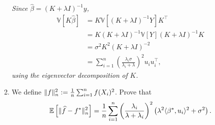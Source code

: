 \documentclass[a4paper,10pt,fleqn]{article}
\newcommand{\E}{\ensuremath{\mathbb{E}}}
\newcommand{\1}{\ensuremath{\mathbbm{1}}}
\begin{document}
\begin{enumerate}
\vspace{.2cm}

{\em
Since $\widehat{\beta} = (K + \lambda I)^{-1}y$, 
		\begin{align*}
			\mathbb{V}[K \widehat{\beta}] & = K \mathbb{V}[ (K + \lambda I)^{-1} Y ] K^\top\\
			& = K (K + \lambda I)^{-1} \mathbb{V}[Y](K + \lambda I)^{-1} K\\
			& = \sigma^2 K^2 (K + \lambda I)^{-2}\\
			& = \sum_{i=1}^n \left( \frac{\lambda_i \sigma }{\lambda_i + \lambda}\right)^2 u_i u_i^\top,
		\end{align*}
	using the eigenvector decomposition of $K$.
}
	\item We define $\|f\|_{n}^2:= {1\over n}\sum_{i=1}^nf(X_{i})^2$. Prove that
	$$\E\left[\|\widehat f - f^*\|^2_{n} \right]={1\over n}\sum_{i=1}^n \left( \lambda_{i}\over \lambda+\lambda_{i}\right)^2 \left(\lambda^2\langle \beta^*, u_{i}\rangle^2+\sigma^2\right).$$

\vspace{.2cm}

{\em

}
\end{enumerate}
\end{document}
